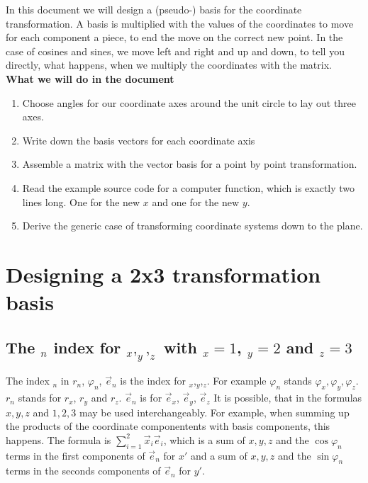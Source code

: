 \documentclass[a4paper]{article}
\begin{document}
In this document we will design a (pseudo-) basis for the coordinate transformation. 
A basis is multiplied with the values of the coordinates to move for each component 
a piece, to end the move on the correct new point.
In the case of cosines and sines, we move left and right and up and down, to 
tell you directly, what happens, when we multiply the coordinates with the matrix.\\

\textbf{What we will do in the document}

\begin{enumerate}
\item Choose angles for our coordinate axes around the unit circle to lay out three axes.
\item Write down the basis vectors for each coordinate axis
\item Assemble a matrix with the vector basis for a point by point transformation.
\item Read the example source code for a computer function, which is exactly two lines long. One for the new $x$ and one for the new $y$.
\item Derive the generic case of transforming coordinate systems down to the plane.
\end{enumerate}

\section{Designing a 2x3 transformation basis}

\subsection{The $_n$ index for $_x,_y,_z$ with $_x=1$, $_y=2$ and $_z=3$}

The index $_n$ in $r_n$, $\varphi_n$, $\vec{e}_n$ is the index for $_x$,$_y$,$_z$. For example $\varphi_n$  stands $\varphi_x, \varphi_y, \varphi_z$. $r_n$ stands for $r_x$, $r_y$ and $r_z$. $\vec{e}_n$ is for $\vec{e}_x$, $\vec{e}_y$, $\vec{e}_z$ It is possible, that in the formulas $x,y,z$ and $1,2,3$ may be used interchangeably. For example, when summing up the products of the coordinate componentents with basis components, this happens. The formula is $\sum_{i=1}^{2}\vec{x}_i\vec{e}_i$, which is a sum of $x,y,z$ and the $\cos \varphi_n$ terms in the first components of $\vec{e}_n$ for $x'$ and a sum of $x,y,z$ and the $\sin \varphi_n$ terms in the seconds components of $\vec{e}_n$ for $y'$.
\end{document}
